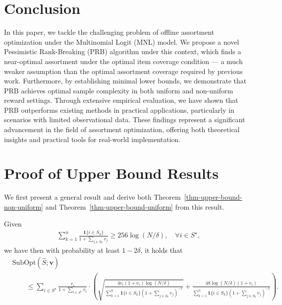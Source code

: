 \documentclass[10pt, letterpaper]{article}
\begin{document}
\section{Conclusion}


In this paper, we tackle the challenging problem of offline assortment optimization under the Multinomial Logit (MNL) model. We propose a novel Pessimistic Rank-Breaking (PRB) algorithm under this context, which finds a near-optimal assortment under the optimal item coverage condition --- a much weaker assumption than the optimal assortment coverage required by previous work. Furthermore, by establishing minimal lower bounds, we demonstrate that PRB achieves optimal sample complexity in both uniform and non-uniform reward settings. Through extensive empirical evaluation, we have shown that PRB outperforms existing methods in practical applications, particularly in scenarios with limited observational data. These findings represent a significant advancement in the field of assortment optimization, offering both theoretical insights and practical tools for real-world implementation.






\newpage 

\appendix


\section{Proof of Upper Bound Results}


We first present a general result and derive both Theorem~\ref{thm-upper-bound-non-uniform} and Theorem~\ref{thm-upper-bound-uniform} from this result.

\begin{theorem}\label{thm-upper-bound} Given \begin{align*}
\sum_{k =1}^n \frac{\bm{1}\{i\in S_k\}}{1+\sum_{j\in S_k }v_j} \geq 256\log(N/\delta),\quad \forall i\in S^\star,
\end{align*}
we have then with probability at least $1-2\delta$, it holds that
\begin{align*}
        &\mathrm{SubOpt}( \widehat{S}; \bm{v})  \\
        &\qquad \le \sum_{i\in S^\star} \frac{r_i}{1+\sum_{i\in S^\star} v_i} \cdot \left(\sqrt{\frac{4v_i(1+v_i)\log (N/\delta) }{\sum_{k = 1}^n \bm{1}\{i\in S_k\}(1+\sum_{j\in S_k}v_j)^{-1}}}  + \frac{48\log(N/\delta) (1+v_i)}{\sum_{k = 1}^n \bm{1}\{i\in S_k\}(1+\sum_{j\in S_k}v_j)^{-1}} \right).
\end{align*}
\end{theorem}
\end{document}
